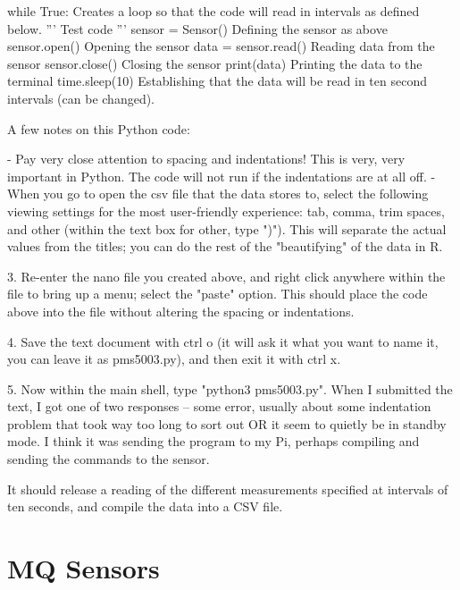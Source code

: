 \documentclass{article}
\begin{document}
  while True:  Creates a loop so that the code will read in intervals as defined below.
    '''
    Test code
    '''
    sensor = Sensor()  Defining the sensor as above
    sensor.open()  Opening the sensor
    data = sensor.read()  Reading data from the sensor
    sensor.close()  Closing the sensor
    print(data)  Printing the data to the terminal
    time.sleep(10)  Establishing that the data will be read in ten second intervals (can be changed).


A few notes on this Python code:

- Pay very close attention to spacing and indentations! This is very, very important in Python.  The code will not run if the indentations are at all off.
- When you go to open the csv file that the data stores to, select the following viewing settings for the most user-friendly experience:  tab, comma, trim spaces, and other (within the text box for other, type ")").  This will separate the actual values from the titles; you can do the rest of the "beautifying" of the data in R.

3.  Re-enter the nano file you created above, and right click anywhere within the file to bring up a menu; select the "paste" option.  This should place the code above into the file without altering the spacing or indentations.

4.  Save the text document with ctrl o (it will ask it what you want to name it, you can leave it as pms5003.py), and then exit it with ctrl x.

5.  Now within the main shell, type "python3 pms5003.py". When I submitted the text, I got one of two responses -- some error, usually about some indentation problem that took way too long to sort out OR it seem to quietly be in standby mode. I think it was sending the program to my Pi, perhaps compiling and sending the commands to the sensor.  

It should release a reading of the different measurements specified at intervals of ten seconds, and compile the data into a CSV file.

\section{MQ Sensors}
\end{document}
